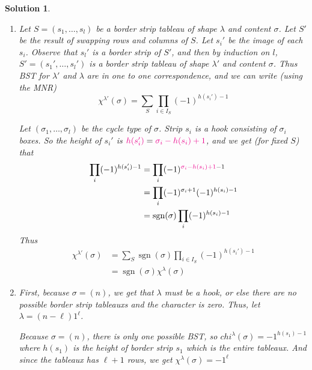 \documentclass{article}
\def\sgn{\operatorname{sgn}}
\def\tcm{\textcolor{magenta}}
\theoremstyle{normal}
\theoremstyle{thmit}
\newtheorem*{solution}{Solution}
\begin{document}
\begin{solution}
\begin{enumerate}[label = (\alph*)]
    \item
        Let $S=(s_1, \dots, s_l)$ be a border strip tableau of shape $\lambda$ and content
        $\sigma$. Let $S'$ be the result of swapping rows and columns of $S$. Let $s_i'$ be the image
        of each $s_i$. Observe that $s_l'$ is a border strip of $S'$, and then by induction on $l$,
        $S'=(s_1', \dots, s_l')$ is a border strip tableau of shape $\lambda'$ and content $\sigma$.
        Thus BST for $\lambda'$ and $\lambda$ are in one to one correspondence, and we can write
        (using the MNR)
        \begin{equation}
            \chi^{\lambda'}(\sigma)=\sum_S\prod_{i\in I_S} (-1)^{h(s_i')-1}
        \end{equation}

        Let $(\sigma_1, \dots, \sigma_l)$ be the cycle type of $\sigma$. Strip $s_i$ is a hook consisting
        of $\sigma_i$ boxes. So the height of $s_i'$ is
        $\textcolor{magenta}{h(s_i')}=\textcolor{magenta}{\sigma_i-h(s_i)+1}$, and we get
        (for fixed $S$) that 
        \begin{subequations}
            \begin{align}
                \prod_{i}(-1)^{h(s_i')-1}
                &=\prod_{i} (-1)^{\tcm{\sigma_i-h(s_i)+1}-1}\\
                &=\prod_{i}(-1)^{\sigma_i+1}(-1)^{h(s_i)-1}\\
                &=\sgn(\sigma)\prod_{i} (-1)^{h(s_i)-1}
            \end{align}
        \end{subequations}
        Thus
        \begin{subequations}
            \begin{align}
                \chi^{\lambda'}(\sigma)
                    &=\sum_S\sgn(\sigma)\prod_{i\in I_S} (-1)^{h(s_i')-1}\\
                    &=\sgn(\sigma)\chi^{\lambda}(\sigma)
            \end{align}
        \end{subequations}
    \item First, because $\sigma = (n)$, we get that $\lambda$ must be a hook, or else there are no possible border strip tableauxs and the character is zero. Thus, let $\lambda = (n-\ell)1^\ell$.
    
    Because $\sigma = (n)$, there is only one possible BST, so $chi^\lambda(\sigma) = -1^{h(s_1)-1}$ where $h(s_1)$ is the height of border strip $s_1$ which is the entire tableaux. And since the tableaux has $\ell + 1$ rows, we get $\chi^\lambda(\sigma)=-1^\ell$
    

\end{enumerate}
\end{solution}
\end{document}
